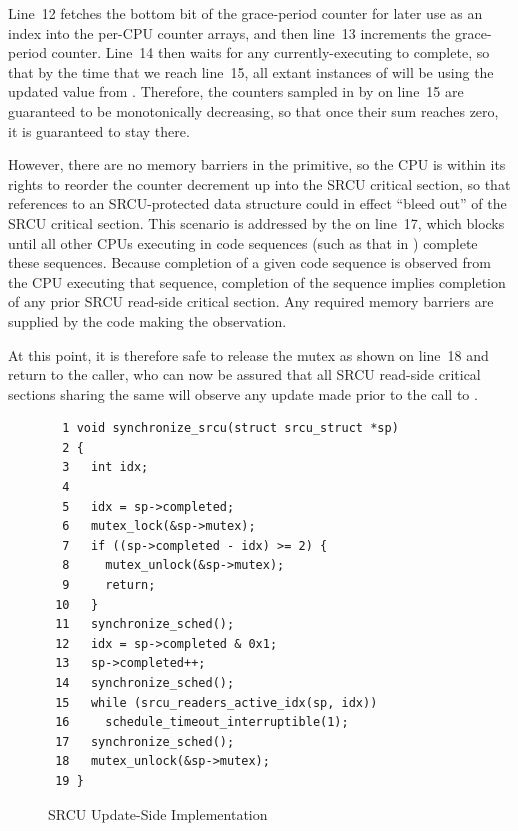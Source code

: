 Line~12 fetches the bottom bit of the grace-period counter for later
use as an index into the per-CPU counter arrays, and then line~13
increments the grace-period counter.
Line~14 then waits for any currently-executing 
to complete, so that by the time that we reach line~15, all
extant instances of  will be using the updated
value from .
Therefore, the counters sampled in by 
on line~15 are guaranteed to
be monotonically decreasing, so that once their sum reaches zero, it
is guaranteed to stay there.

However, there are no memory barriers in the 
primitive, so the CPU is within its rights to reorder the counter
decrement up into the SRCU critical section, so that references to
an SRCU-protected data structure could in effect ``bleed out'' of the
SRCU critical section.
This scenario is addressed by the  on line~17,
which blocks until all other CPUs executing in 
code sequences (such as that in ) complete these
sequences.
Because completion of a given  code sequence
is observed from the CPU executing that sequence, completion of the
sequence implies completion of any prior SRCU read-side critical section.
Any required memory barriers are supplied by the code making the
observation.

At this point, it is therefore safe to release the mutex as shown
on line~18 and return to the caller, who can now be assured that
all SRCU read-side critical sections sharing the same
 
will observe any update made prior to the call to .

\begin{figure}[htbp]
{ \scriptsize
\begin{verbatim}
  1 void synchronize_srcu(struct srcu_struct *sp)
  2 {
  3   int idx;
  4
  5   idx = sp->completed;
  6   mutex_lock(&sp->mutex);
  7   if ((sp->completed - idx) >= 2) {
  8     mutex_unlock(&sp->mutex);
  9     return;
 10   }
 11   synchronize_sched();
 12   idx = sp->completed & 0x1;
 13   sp->completed++;
 14   synchronize_sched();
 15   while (srcu_readers_active_idx(sp, idx))
 16     schedule_timeout_interruptible(1);
 17   synchronize_sched();
 18   mutex_unlock(&sp->mutex);
 19 }
\end{verbatim}
}
\caption{SRCU Update-Side Implementation}
\label{fig:app:rcuimpl:Update-Side Implementation}
\end{figure}

